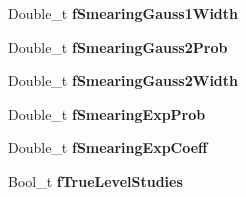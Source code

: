\begin{CompactItemize}
\item 
Double\_\-t \textbf{f\-Smearing\-Gauss1Width}\label{classTMiniNtupleAnalyzer_dc2b542be84934ab1a0ba4700a1af7b5}

\item 
Double\_\-t \textbf{f\-Smearing\-Gauss2Prob}\label{classTMiniNtupleAnalyzer_3510a75b60ab335bf397c6a526e35950}

\item 
Double\_\-t \textbf{f\-Smearing\-Gauss2Width}\label{classTMiniNtupleAnalyzer_cfea921ba15de39c42dda8a7c603f2eb}

\item 
Double\_\-t \textbf{f\-Smearing\-Exp\-Prob}\label{classTMiniNtupleAnalyzer_b06fe90699a58728793e4099daef7cea}

\item 
Double\_\-t \textbf{f\-Smearing\-Exp\-Coeff}\label{classTMiniNtupleAnalyzer_931f93158be90e8eefb1a45945510e32}

\item 
Bool\_\-t \textbf{f\-True\-Level\-Studies}\label{classTMiniNtupleAnalyzer_163b0c21dcf6ce3305afdf87d5f7c44d}

\end{CompactItemize}
